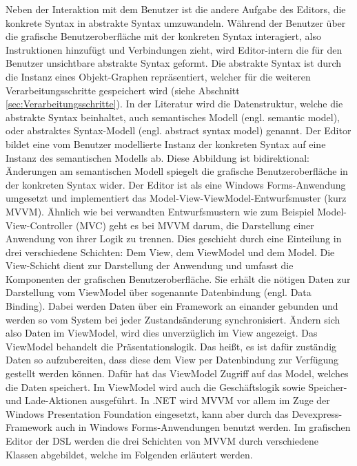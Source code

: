 \noindent Neben der Interaktion mit dem Benutzer ist die andere Aufgabe des Editors, die konkrete Syntax in abstrakte Syntax umzuwandeln. Während der Benutzer über die grafische Benutzeroberfläche mit der konkreten Syntax interagiert, also Instruktionen hinzufügt und Verbindungen zieht, wird Editor-intern die für den Benutzer unsichtbare abstrakte Syntax geformt. Die abstrakte Syntax ist durch die Instanz eines Objekt-Graphen repräsentiert, welcher für die weiteren Verarbeitungsschritte gespeichert wird (siehe Abschnitt \ref{sec:Verarbeitungsschritte}). In der Literatur wird die Datenstruktur, welche die abstrakte Syntax beinhaltet, auch semantisches Modell (engl. semantic model)\cite[S. 159ff]{Fowler:11}, oder abstraktes Syntax-Modell (engl. abstract syntax model)\cite[S. 78ff]{Kleppe:09} genannt. Der Editor bildet eine vom Benutzer modellierte Instanz der konkreten Syntax auf eine Instanz des semantischen Modells ab. Diese Abbildung ist bidirektional: Änderungen am semantischen Modell spiegelt die grafische Benutzeroberfläche in der konkreten Syntax wider. 
\newline
Der Editor ist als eine Windows Forms-Anwendung umgesetzt und implementiert das Model-View-ViewModel-Entwurfsmuster (kurz MVVM). Ähnlich wie bei verwandten Entwurfsmustern wie zum Beispiel Model-View-Controller (MVC) geht es bei MVVM darum, die Darstellung einer Anwendung von ihrer Logik zu trennen. Dies geschieht durch eine Einteilung in drei verschiedene Schichten: Dem View, dem ViewModel und dem Model. Die View-Schicht dient zur Darstellung der Anwendung und umfasst die Komponenten der grafischen Benutzeroberfläche. Sie erhält die nötigen Daten zur Darstellung vom ViewModel über sogenannte Datenbindung (engl. Data Binding). Dabei werden Daten über ein Framework an einander gebunden und werden so vom System bei jeder Zustandsänderung synchronisiert. Ändern sich also Daten im ViewModel, wird dies unverzüglich im View angezeigt. 
\newpage
\noindent Das ViewModel behandelt die Präsentationslogik. Das heißt, es ist dafür zuständig Daten so aufzubereiten, dass diese dem View per Datenbindung zur Verfügung gestellt werden können. Dafür hat das ViewModel Zugriff auf das Model, welches die Daten speichert. Im ViewModel wird auch die Geschäftslogik sowie Speicher- und Lade-Aktionen ausgeführt. In .NET wird MVVM vor allem im Zuge der Windows Presentation Foundation eingesetzt, kann aber durch das Devexpress-Framework auch in Windows Forms-Anwendungen benutzt werden. 
\newline
Im grafischen Editor der DSL werden die drei Schichten von MVVM durch verschiedene Klassen abgebildet, welche im Folgenden erläutert werden.

